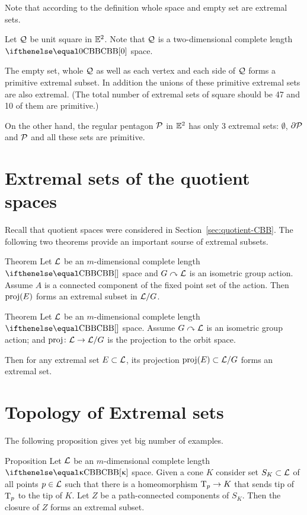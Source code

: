 Note that according to the definition whole space and empty set are extremal sets.

Let $\mathcal{Q}$ be unit square in $\mathbb{E}^2$.
Note that $\mathcal{Q}$ is a two-dimensional complete length $\Alex0$ space.

The empty set, 
whole $\mathcal{Q}$ as well as each vertex 
and each side of $\mathcal{Q}$ forms a primitive extremal subset.
In addition the unions of these primitive extremal sets are also extremal.
(The total number of extremal sets of square should be 47 and 10 of them are primitive.)

On the other hand, the regular pentagon $\mathcal{P}$ in $\mathbb{E}^2$
has only 3 extremal sets: $\emptyset$, $\partial\mathcal{P}$ and $\mathcal{P}$
and all these sets are primitive.

\section{Extremal sets of the quotient spaces}

Recall that quotient spaces 
were considered in Section~\ref{sec:quotient-CBB}.
The following two theorems provide an important sourse of extremal subsets.

\begin{thm}{Theorem}
Let $\mathcal{L}$ be an $m$-dimensional complete length $\Alex{}$ space
and $G\curvearrowright\mathcal{L}$ is an isometric group action.
Assume $A$ is a connected component of the fixed point set of the action.
Then $\mathop{\rm proj}\nolimits(E)$ forms an extremal subset in $\mathcal{L}/G$.
\end{thm}

\begin{thm}{Theorem}
Let $\mathcal{L}$ be an $m$-dimensional complete length $\Alex{}$ space.
Assume $G\curvearrowright\mathcal{L}$ is an isometric group action;
and $\proj\:\spc{L}\to \spc{L}/G$ is the projection to the orbit space.

Then for any extremal set
$E\subset \spc{L}$,
its projection $\proj(E)\subset \spc{L}/G$ forms an extremal set.

\end{thm}




\section{Topology of Extremal sets}

The following proposition gives yet big number of examples.

\begin{thm}{Proposition}\label{prop:t-cone} 
Let $\mathcal{L}$ be an $m$-dimensional complete length $\Alex\kappa$ space.
Given a cone $K$ 
consider set $S_K\subset \spc{L}$ of all points 
$p\in \spc{L}$ such that there is a homeomorphism $\T_p\to K$ that sends tip of $\text{\rm T}_p$ to the tip of $K$.
Let $Z$ be a path-connected components of $S_K$.
Then the closure of $Z$ forms an extremal subset. %
\end{thm}

